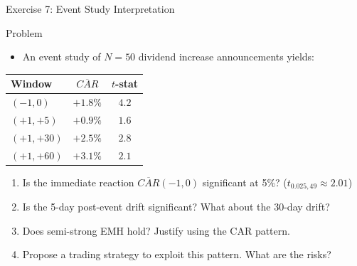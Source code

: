 \documentclass[9pt, aspectratio=169, t]{beamer}
\theoremstyle{definition}
\newenvironment{cminipage}[1]{%
    \par\noindent\hfill\begin{minipage}{#1}\ignorespaces
}{%
    \end{minipage}\hfill\null\par
}
\begin{document}
\begin{frame}{Exercise 7: Event Study Interpretation}
\begin{cminipage}{0.95\textwidth}
\begin{block}{Problem}
\begin{itemize}
\item An event study of $N = 50$ dividend increase announcements yields:
\end{itemize}
\begin{center}
{\small
\renewcommand{\arraystretch}{1.2}
\begin{tabular}{lcc}
\toprule
\textbf{Window} & \textbf{$\overline{CAR}$} & \textbf{$t$-stat} \\
\midrule
$(-1, 0)$ & $+1.8\%$ & $4.2$ \\
$(+1, +5)$ & $+0.9\%$ & $1.6$ \\
$(+1, +30)$ & $+2.5\%$ & $2.8$ \\
$(+1, +60)$ & $+3.1\%$ & $2.1$ \\
\bottomrule
\end{tabular}
}
\end{center}
\end{block}
\begin{enumerate}
    \item Is the immediate reaction $\overline{CAR}(-1,0)$ significant at 5\%? ($t_{0.025,49} \approx 2.01$)
    \item Is the 5-day post-event drift significant? What about the 30-day drift?
    \item Does semi-strong EMH hold? Justify using the CAR pattern.
    \item Propose a trading strategy to exploit this pattern. What are the risks?
\end{enumerate}
\end{cminipage}
\end{frame}
\end{document}
